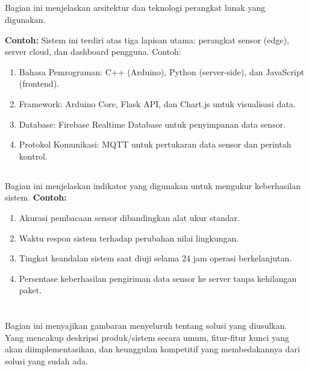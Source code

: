 \documentclass{elsinta}
\begin{document}
\subsection{\SoftwareSpecTitle}
Bagian ini menjelaskan arsitektur dan teknologi perangkat lunak yang digunakan. 

\textbf{Contoh:}
Sistem ini terdiri atas tiga lapisan utama: perangkat sensor (edge), server cloud, dan dashboard pengguna. Contoh:
\begin{enumerate}
    \item Bahasa Pemrograman: C++ (Arduino), Python (server-side), dan JavaScript (frontend). 
    \item Framework: Arduino Core, Flask API, dan Chart.js untuk visualisasi data. 
    \item Database: Firebase Realtime Database untuk penyimpanan data sensor. 
    \item Protokol Komunikasi: MQTT untuk pertukaran data sensor dan perintah kontrol. 
\end{enumerate}



\subsection{\PerformanceCriteriaTitle}
Bagian ini menjelaskan indikator yang digunakan untuk mengukur keberhasilan sistem. \textbf{Contoh:}
\begin{enumerate}
    \item Akurasi pembacaan sensor dibandingkan alat ukur standar. 
    \item Waktu respon sistem terhadap perubahan nilai lingkungan. 
    \item Tingkat keandalan sistem saat diuji selama 24 jam operasi berkelanjutan. 
    \item Persentase keberhasilan pengiriman data sensor ke server tanpa kehilangan paket. 
\end{enumerate}


\section{\ProposedSolutionTitle}

Bagian ini menyajikan gambaran menyeluruh tentang solusi yang diusulkan. Yang mencakup deskripsi produk/sistem secara umum, fitur-fitur kunci yang akan diimplementasikan, dan keunggulan kompetitif yang membedakannya dari solusi yang sudah ada.
\end{document}

